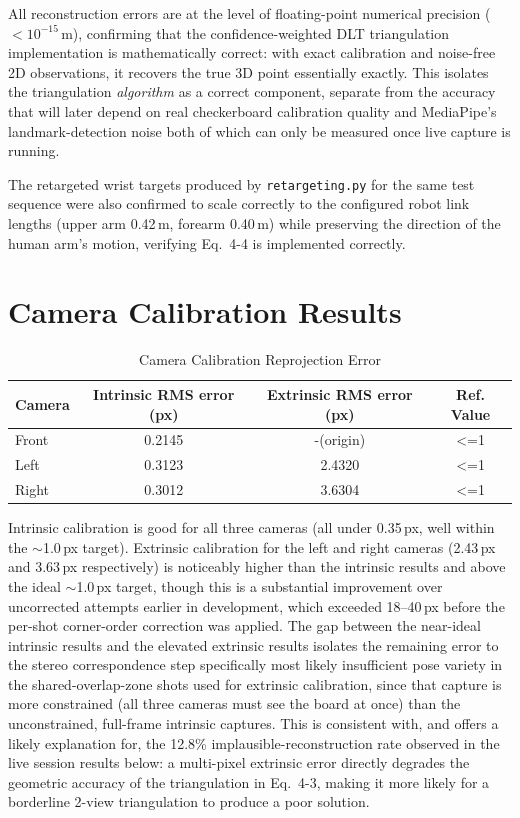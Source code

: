 All reconstruction errors are at the level of floating-point numerical
precision ($<10^{-15}$\,m), confirming that the confidence-weighted DLT
triangulation implementation is mathematically correct: with exact
calibration and noise-free 2D observations, it recovers the true 3D point
essentially exactly. This isolates the triangulation \emph{algorithm} as a
correct component, separate from the accuracy that will later depend on
real checkerboard calibration quality and MediaPipe's landmark-detection
noise  both of which can only be measured once live capture is running.

The retargeted wrist targets produced by \texttt{retargeting.py} for the
same test sequence were also confirmed to scale correctly to the
configured robot link lengths (upper arm 0.42\,m, forearm 0.40\,m) while
preserving the direction of the human arm's motion, verifying Eq.~4-4 is
implemented correctly.

\section{Camera Calibration Results}

\begin{table}[H]
\centering
\caption{Camera Calibration Reprojection Error}
\label{tab:calib-results}
\begin{tabular}{lccc}
\hline
\textbf{Camera} & \textbf{Intrinsic RMS error (px)} & \textbf{Extrinsic RMS error (px)} & \textbf{Ref. Value} \\
\hline
Front & 0.2145 & -(origin) & <=1\\
Left & 0.3123 & 2.4320 & <=1\\
Right & 0.3012 & 3.6304 & <=1\\
\hline
\end{tabular}
\end{table}

Intrinsic calibration is good for all three cameras (all under 0.35\,px,
well within the $\sim$1.0\,px target). Extrinsic calibration for the
left and right cameras (2.43\,px and 3.63\,px respectively) is
noticeably higher than the intrinsic results and above the ideal
$\sim$1.0\,px target, though this is a substantial improvement over
uncorrected attempts earlier in development, which exceeded 18--40\,px
before the per-shot corner-order correction was applied.
The gap between the near-ideal intrinsic results and the elevated
extrinsic results isolates the remaining error to the stereo
correspondence step specifically  most likely insufficient pose variety
in the shared-overlap-zone shots used for extrinsic calibration, since
that capture is more constrained (all three cameras must see the board
at once) than the unconstrained, full-frame intrinsic captures. This is
consistent with, and offers a likely explanation for, the 12.8\%
implausible-reconstruction rate observed in the live session results
below: a multi-pixel extrinsic error directly degrades the geometric
accuracy of the triangulation in Eq.~4-3, making it more likely for a
borderline 2-view triangulation to produce a poor solution.

